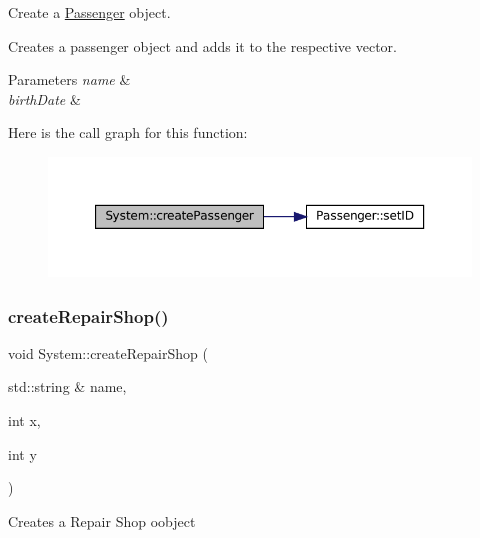 Create a \mbox{\hyperlink{classPassenger}{Passenger}} object. 

Creates a passenger object and adds it to the respective vector.


\begin{DoxyParams}{Parameters}
{\em name} & \\
\hline
{\em birth\+Date} & \\
\hline
\end{DoxyParams}
Here is the call graph for this function\+:
\nopagebreak
\begin{figure}[H]
\begin{center}
\leavevmode
\includegraphics[width=350pt]{classSystem_a635ad100d71c3d964047376505d7850b_cgraph}
\end{center}
\end{figure}
\mbox{\label{classSystem_a9a71a2cf8064bb20d4235b5aecb927f4}} 
\subsubsection{\texorpdfstring{create\+Repair\+Shop()}{createRepairShop()}}
{\footnotesize\ttfamily void System\+::create\+Repair\+Shop (\begin{DoxyParamCaption}\item[{std\+::string \&}]{name,  }\item[{int}]{x,  }\item[{int}]{y }\end{DoxyParamCaption})}

Creates a Repair Shop oobject


